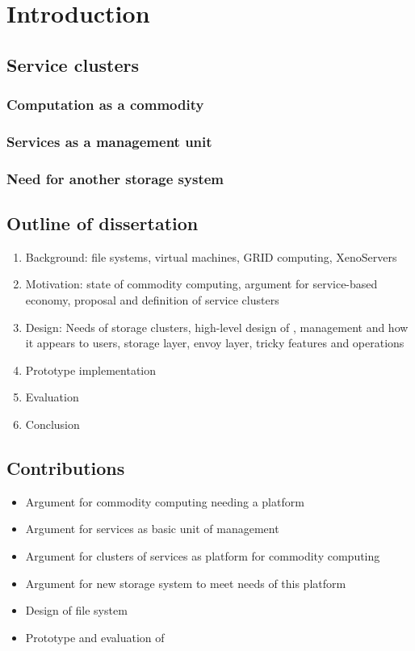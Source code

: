 \chapter{Introduction}

\section{Service clusters}

\subsection{Computation as a commodity}
\subsection{Services as a management unit}
\subsection{Need for another storage system}

\section{Outline of dissertation}
\begin{enumerate}
\item Background: file systems, virtual machines, GRID computing, XenoServers
\item Motivation: state of commodity computing, argument for service-based economy, proposal and definition of service clusters
\item Design: Needs of storage clusters, high-level design of \envoy, management and how it appears to users, storage layer, envoy layer, tricky features and operations
\item Prototype implementation
\item Evaluation
\item Conclusion
\end{enumerate}

\section{Contributions}
\begin{itemize}
\item Argument for commodity computing needing a platform
\item Argument for services as basic unit of management
\item Argument for clusters of services as platform for commodity computing
\item Argument for new storage system to meet needs of this platform
\item Design of \envoy file system
\item Prototype and evaluation of \envoy
\end{itemize}
